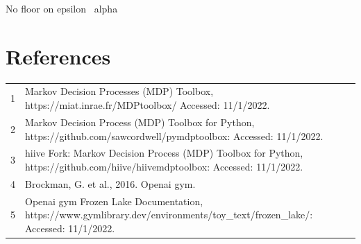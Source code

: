 \documentclass[letterpaper]{article} %
\begin{document}
No floor on epsilon \ alpha

\section{References}
\begin{tabular}{l p{2.75in}}
\\
1 & Markov Decision Processes (MDP) Toolbox, https://miat.inrae.fr/MDPtoolbox/ Accessed: 11/1/2022.
\\
2 & Markov Decision Process (MDP) Toolbox for Python, https://github.com/sawcordwell/pymdptoolbox: Accessed: 11/1/2022.
\\
3 & hiive Fork: Markov Decision Process (MDP) Toolbox for Python, https://github.com/hiive/hiivemdptoolbox: Accessed: 11/1/2022.
\\
4 & Brockman, G. et al., 2016. Openai gym.
\\
5 & Openai gym Frozen Lake Documentation,  https://www.gymlibrary.dev/environments/toy\_text/frozen\_lake/: Accessed: 11/1/2022.

\end{tabular}
\end{document}
